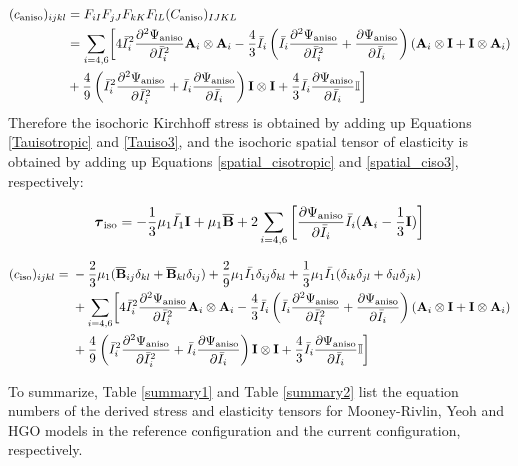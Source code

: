 \begin{appendices}
\begin{equation} \label{spatial_ciso3}
\begin{split}
(c_\mathrm{aniso})_{ijkl} &=  F_{iI}F_{jJ}F_{kK}F_{lL}(C_\mathrm{aniso})_{IJKL} \\
&= 
 \sum_{i = 4, 6} \biggl[4{\bar{I}_i}^2\frac{\partial^2\Psi_\mathrm{aniso}}{\partial{\bar{I}_i}^2} \bold{A}_{i} \otimes \bold{A}_{i} - \frac{4}{3}\bar{I}_i\left(\bar{I}_i\frac{\partial^2\Psi_\mathrm{aniso}}{\partial{\bar{I}_i}^2} + \frac{\partial\Psi_\mathrm{aniso}}{\partial{\bar{I}_i}}\right)
 (\bold{A}_{i} \otimes \bold{I} + \bold{I} \otimes \bold{A}_i) \\
&+ \frac{4}{9}\left({\bar{I}_i}^2\frac{\partial^2\Psi_\mathrm{aniso}}{\partial{\bar{I}_i}^2} + \bar{I}_i\frac{\partial\Psi_\mathrm{aniso}}{\partial{\bar{I}_i}}\right)\bold{I} \otimes \bold{I} 
+ \frac{4}{3}\bar{I}_i \frac{\partial\Psi_\mathrm{aniso}}{\partial{\bar{I}_i}} \mathbb{I} \biggr]
\end{split}
\end{equation}
Therefore the isochoric Kirchhoff stress is obtained by adding up Equations \ref{Tauisotropic} and \ref{Tauiso3}, and the isochoric spatial tensor of elasticity is obtained by adding up Equations \ref{spatial_cisotropic} and \ref{spatial_ciso3}, respectively:

\begin{equation} \label{HGO_tauiso}
\boldsymbol{\tau}_\mathrm{iso} =  - \frac{1}{3}\mu_1\bar{I_1}\bold{I} + \mu_1{\overline{\bold{B}}}
+ 2\sum_{i = 4, 6}\left[\frac{\partial{\Psi_\mathrm{aniso}}}{\partial{\bar{I}_i}}\bar{I}_i (\bold{A}_{i} - \frac{1}{3}\bold{I})\right]
\end{equation}
 
\begin{equation} \label{HGO_spatial_ciso}
\begin{split}
(c_\mathrm{iso})_{ijkl} = {} &  - \frac{2}{3}\mu_1({\overline{\bold{B}}}_{ij}\delta_{kl} + {\overline{\bold{B}}}_{kl}\delta_{ij}) 
+ \frac{2}{9}\mu_1\bar{I_1}  \delta_{ij}\delta_{kl}
+ \frac{1}{3}\mu_1\bar{I_1} (\delta_{ik}\delta_{jl} + \delta_{il}\delta_{jk}) \\
&+ 
\sum_{i = 4, 6} \biggl[4{\bar{I}_i}^2\frac{\partial^2\Psi_\mathrm{aniso}}{\partial{\bar{I}_i}^2} \bold{A}_{i} \otimes \bold{A}_{i} - \frac{4}{3}\bar{I}_i\left(\bar{I}_i\frac{\partial^2\Psi_\mathrm{aniso}}{\partial{\bar{I}_i}^2} + \frac{\partial\Psi_\mathrm{aniso}}{\partial{\bar{I}_i}}\right)
 (\bold{A}_{i} \otimes \bold{I} + \bold{I} \otimes \bold{A}_i) \\
&+ 
\frac{4}{9}\left({\bar{I}_i}^2\frac{\partial^2\Psi_\mathrm{aniso}}{\partial{\bar{I}_i}^2} + \bar{I}_i\frac{\partial\Psi_\mathrm{aniso}}{\partial{\bar{I}_i}}\right)\bold{I} \otimes \bold{I} 
+ \frac{4}{3}\bar{I}_i \frac{\partial\Psi_\mathrm{aniso}}{\partial{\bar{I}_i}} \mathbb{I} \biggr]
\end{split}
\end{equation}

To summarize, Table \ref{summary1} and Table \ref{summary2} list the equation numbers of the derived stress and elasticity tensors for Mooney-Rivlin, Yeoh and HGO models in the reference configuration and the current configuration, respectively.

\end{appendices}
